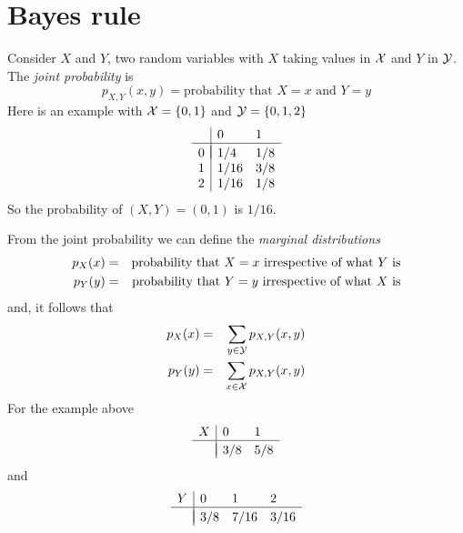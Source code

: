 \documentclass[12pt]{article}
\begin{document}
\section*{Bayes rule}

Consider $X$ and $Y$, two random variables with $X$ taking values in ${\cal X}$ and $Y$ in ${\cal
  Y}$. The {\sl joint probability} is
\begin{equation}
p_{X,Y}(x,y)=\mbox{probability that $X=x$ and $Y=y$}
\end{equation}
Here is an example with ${\cal X}=\{0,1\}$ and ${\cal Y}=\{0,1,2\}$
\begin{equation}
\begin{array}{l|ll}
&0&1\\
\hline\\[-10pt]
0&1/4&1/8\\
1&1/16&3/8\\
2&1/16&1/8
\end{array}
\end{equation}
So the probability of $(X,Y)=(0,1)$ is $1/16$.

From the joint probability we can define the {\sl marginal distributions}
\begin{eqnarray}
p_{X}(x)&=&\mbox{probability that $X=x$ irrespective of what $Y$ is}\cr
p_{Y}(y)&=&\mbox{probability that $Y=y$ irrespective of what $X$ is}
\end{eqnarray}
and, it follows that
\begin{eqnarray}
p_{X}(x)&=&\sum_{y\in{\cal Y}}p_{X,Y}(x,y)\cr
p_{Y}(y)&=&\sum_{x\in{\cal X}}p_{X,Y}(x,y)
\end{eqnarray}
For the example above
\begin{equation}
\begin{array}{l|ll}
X&0&1\\
\hline\\[-10pt]
 &3/8&5/8
\end{array}
\end{equation}
and
\begin{equation}
\begin{array}{l|lll}
Y&0&1&2\\
\hline\\[-10pt]
&3/8&7/16&3/16
\end{array}
\end{equation}
\end{document}
